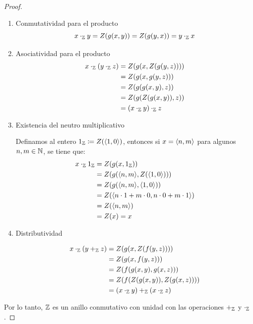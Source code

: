 \begin{proof}
\begin{enumerate}
		Si $x =\inner*{n, m}$ para algunos $n, m\in\NN$, entonces definamos $-x\coloneqq Z\pa*{\inner*{m, n}}$. Luego:
		\begin{align*}
			x +_{\ZZ}\pa*{-x} &= Z\pa*{f\pa*{x, -x}}\\
			&= Z\pa*{f\pa*{\inner*{n, m}, Z\pa*{\inner*{m, n}}}}\\
			&= Z\pa*{f\pa*{\inner*{n, m},\inner*{m, n}}}\\
			&= Z\pa*{\inner*{n + m, n + m}}\\
			&= Z\pa*{\inner*{0, 0}} = 0_{\ZZ}
		\end{align*}
		\item Conmutatividad para el producto
		\[
			x\cdot_{\ZZ} y = Z\pa*{g\pa*{x, y}} = Z\pa*{g\pa*{y, x}} = y\cdot_{\ZZ} x
		\]
		\item Asociatividad para el producto
		\begin{align*}
			x\cdot_{\ZZ}\pa*{y\cdot_{\ZZ} z} &= Z\pa*{g\pa*{x, Z\pa*{g\pa*{y, z}}}}\\
			&= Z\pa*{g\pa*{x, g\pa*{y, z}}}\\
			&= Z\pa*{g\pa*{g\pa*{x, y}, z}}\\
			&= Z\pa*{g\pa*{Z\pa*{g\pa*{x, y}}, z}}\\
			&=\pa*{x\cdot_{\ZZ} y}\cdot_{\ZZ} z
		\end{align*}
		\item Existencia del neutro multiplicativo

		Definamos al entero $1_{\ZZ}\coloneqq Z\pa*{\inner*{1, 0}}$, entonces si $x =\inner*{n, m}$ para algunos $n, m\in\NN$, se tiene que:
		\begin{align*}
			x\cdot_{\ZZ} 1_{\ZZ} &= Z\pa*{g\pa*{x, 1_{\ZZ}}}\\
			&= Z\pa*{g\pa*{\inner*{n, m},Z\pa*{\inner*{1, 0}}}}\\
			&= Z\pa*{g\pa*{\inner*{n, m},\inner*{1, 0}}}\\
			&= Z\pa*{\inner*{n\cdot 1 + m\cdot 0, n\cdot 0 + m\cdot 1}}\\
			&= Z\pa*{\inner*{n, m}}\\
			&= Z\pa*{x} = x
		\end{align*}

		\item Distributividad

		\begin{align*}
			x\cdot_{\ZZ}\pa*{y +_{\ZZ} z} &= Z\pa*{g\pa*{x, Z\pa*{f\pa*{y, z}}}}\\
			&= Z\pa*{g\pa*{x, f\pa*{y, z}}}\\
			&= Z\pa*{f\pa*{g\pa*{x, y}, g\pa*{x, z}}}\\
			&= Z\pa*{f\pa*{Z\pa*{g\pa*{x, y}}, Z\pa*{g\pa*{x, z}}}}\\
			&=\pa*{x\cdot_{\ZZ} y} +_{\ZZ}\pa*{x\cdot_{\ZZ} z}
		\end{align*}
	\end{enumerate}

	Por lo tanto, $\mathbb{Z}$ es un anillo conmutativo con unidad con las operaciones $+_{\mathbb{Z}}$ y $\cdot_{\mathbb{Z}}$.
\end{proof}

